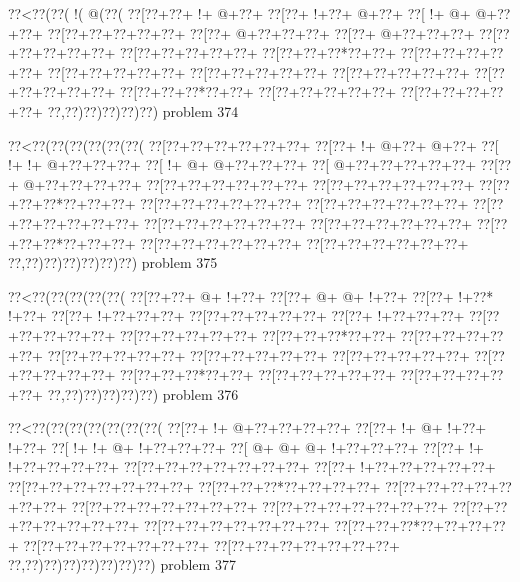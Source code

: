 \vbox{\vbox{\goo
\0??<\0??(\0??(\- !(\- @(\0??(
\0??[\0??+\0??+\- !+\- @+\0??+
\0??[\0??+\- !+\0??+\- @+\0??+
\0??[\- !+\- @+\- @+\0??+\0??+
\0??[\0??+\0??+\0??+\0??+\0??+
\0??[\0??+\- @+\0??+\0??+\0??+
\0??[\0??+\- @+\0??+\0??+\0??+
\0??[\0??+\0??+\0??+\0??+\0??+
\0??[\0??+\0??+\0??+\0??+\0??+
\0??[\0??+\0??+\0??*\0??+\0??+
\0??[\0??+\0??+\0??+\0??+\0??+
\0??[\0??+\0??+\0??+\0??+\0??+
\0??[\0??+\0??+\0??+\0??+\0??+
\0??[\0??+\0??+\0??+\0??+\0??+
\0??[\0??+\0??+\0??+\0??+\0??+
\0??[\0??+\0??+\0??*\0??+\0??+
\0??[\0??+\0??+\0??+\0??+\0??+
\0??[\0??+\0??+\0??+\0??+\0??+
\0??,\0??)\0??)\0??)\0??)\0??)
}
\hfil problem 374\hfil\break
}

\vbox{\vbox{\goo
\0??<\0??(\0??(\0??(\0??(\0??(\0??(
\0??[\0??+\0??+\0??+\0??+\0??+\0??+
\0??[\0??+\- !+\- @+\0??+\- @+\0??+
\0??[\- !+\- !+\- @+\0??+\0??+\0??+
\0??[\- !+\- @+\- @+\0??+\0??+\0??+
\0??[\- @+\0??+\0??+\0??+\0??+\0??+
\0??[\0??+\- @+\0??+\0??+\0??+\0??+
\0??[\0??+\0??+\0??+\0??+\0??+\0??+
\0??[\0??+\0??+\0??+\0??+\0??+\0??+
\0??[\0??+\0??+\0??*\0??+\0??+\0??+
\0??[\0??+\0??+\0??+\0??+\0??+\0??+
\0??[\0??+\0??+\0??+\0??+\0??+\0??+
\0??[\0??+\0??+\0??+\0??+\0??+\0??+
\0??[\0??+\0??+\0??+\0??+\0??+\0??+
\0??[\0??+\0??+\0??+\0??+\0??+\0??+
\0??[\0??+\0??+\0??*\0??+\0??+\0??+
\0??[\0??+\0??+\0??+\0??+\0??+\0??+
\0??[\0??+\0??+\0??+\0??+\0??+\0??+
\0??,\0??)\0??)\0??)\0??)\0??)\0??)
}
\hfil problem 375\hfil\break
}

\vbox{\vbox{\goo
\0??<\0??(\0??(\0??(\0??(\0??(
\0??[\0??+\0??+\- @+\- !+\0??+
\0??[\0??+\- @+\- @+\- !+\0??+
\0??[\0??+\- !+\0??*\- !+\0??+
\0??[\0??+\- !+\0??+\0??+\0??+
\0??[\0??+\0??+\0??+\0??+\0??+
\0??[\0??+\- !+\0??+\0??+\0??+
\0??[\0??+\0??+\0??+\0??+\0??+
\0??[\0??+\0??+\0??+\0??+\0??+
\0??[\0??+\0??+\0??*\0??+\0??+
\0??[\0??+\0??+\0??+\0??+\0??+
\0??[\0??+\0??+\0??+\0??+\0??+
\0??[\0??+\0??+\0??+\0??+\0??+
\0??[\0??+\0??+\0??+\0??+\0??+
\0??[\0??+\0??+\0??+\0??+\0??+
\0??[\0??+\0??+\0??*\0??+\0??+
\0??[\0??+\0??+\0??+\0??+\0??+
\0??[\0??+\0??+\0??+\0??+\0??+
\0??,\0??)\0??)\0??)\0??)\0??)
}
\hfil problem 376\hfil\break
}

\vbox{\vbox{\goo
\0??<\0??(\0??(\0??(\0??(\0??(\0??(\0??(
\0??[\0??+\- !+\- @+\0??+\0??+\0??+\0??+
\0??[\0??+\- !+\- @+\- !+\0??+\- !+\0??+
\0??[\- !+\- !+\- @+\- !+\0??+\0??+\0??+
\0??[\- @+\- @+\- @+\- !+\0??+\0??+\0??+
\0??[\0??+\- !+\- !+\0??+\0??+\0??+\0??+
\0??[\0??+\0??+\0??+\0??+\0??+\0??+\0??+
\0??[\0??+\- !+\0??+\0??+\0??+\0??+\0??+
\0??[\0??+\0??+\0??+\0??+\0??+\0??+\0??+
\0??[\0??+\0??+\0??*\0??+\0??+\0??+\0??+
\0??[\0??+\0??+\0??+\0??+\0??+\0??+\0??+
\0??[\0??+\0??+\0??+\0??+\0??+\0??+\0??+
\0??[\0??+\0??+\0??+\0??+\0??+\0??+\0??+
\0??[\0??+\0??+\0??+\0??+\0??+\0??+\0??+
\0??[\0??+\0??+\0??+\0??+\0??+\0??+\0??+
\0??[\0??+\0??+\0??*\0??+\0??+\0??+\0??+
\0??[\0??+\0??+\0??+\0??+\0??+\0??+\0??+
\0??[\0??+\0??+\0??+\0??+\0??+\0??+\0??+
\0??,\0??)\0??)\0??)\0??)\0??)\0??)\0??)
}
\hfil problem 377\hfil\break
}

